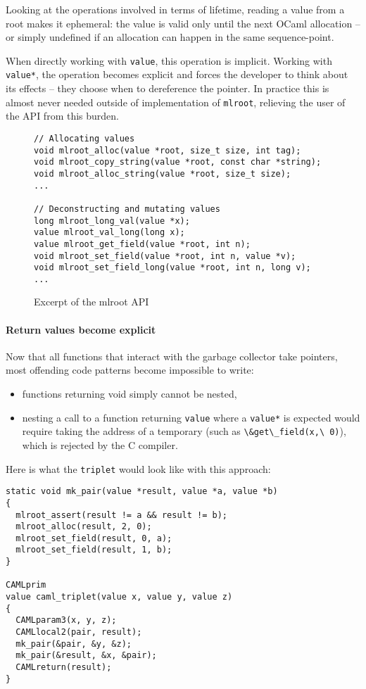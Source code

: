 \documentclass[a4paper]{easychair}
\newcommand{\cpp}[1]{\lstinline[style=C++]{#1}}
\begin{document}
Looking at the operations involved in terms of lifetime, reading a value
from a root makes it ephemeral: the value is valid only until the next
OCaml allocation -- or simply undefined if an allocation can happen in
the same sequence-point.

When directly working with \cpp{value}, this operation is implicit.
Working with \cpp{value*}, the operation becomes explicit and forces
the developer to think about its effects -- they choose when to
dereference the pointer.
In practice this is almost never needed outside of implementation of
\cpp{mlroot}, relieving the user of the API from this burden.

\begin{figure}[htbp]
\begin{lstlisting}[style=C++]
// Allocating values
void mlroot_alloc(value *root, size_t size, int tag);
void mlroot_copy_string(value *root, const char *string);
void mlroot_alloc_string(value *root, size_t size);
...
    
// Deconstructing and mutating values
long mlroot_long_val(value *x);
value mlroot_val_long(long x);
value mlroot_get_field(value *root, int n);
void mlroot_set_field(value *root, int n, value *v);
void mlroot_set_field_long(value *root, int n, long v);
...
\end{lstlisting}
  \caption{Excerpt of the mlroot API}
  \label{fig:mlroot}
\end{figure}

\paragraph{Return values become explicit}

Now that all functions that interact with the garbage collector take
pointers, most offending code patterns become impossible to write:
%
\begin{itemize}
\item functions returning void simply cannot be nested,
\item nesting a call to a function returning \cpp{value} where a
      \cpp{value*} is expected would require taking the address of a
      temporary (such as \cpp{\&get\_field(x,\ 0)}), which is rejected by the C
      compiler.
\end{itemize}

Here is what the \cpp{triplet} would look like with this approach:
%
\begin{lstlisting}[style=C++]
static void mk_pair(value *result, value *a, value *b)
{
  mlroot_assert(result != a && result != b);
  mlroot_alloc(result, 2, 0);
  mlroot_set_field(result, 0, a);
  mlroot_set_field(result, 1, b);
}

CAMLprim
value caml_triplet(value x, value y, value z)
{
  CAMLparam3(x, y, z);
  CAMLlocal2(pair, result);
  mk_pair(&pair, &y, &z);
  mk_pair(&result, &x, &pair);
  CAMLreturn(result);
}
\end{lstlisting}
\end{document}
